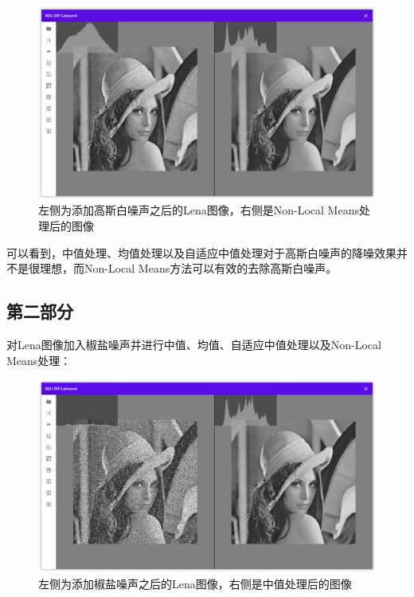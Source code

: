 \documentclass{article}
\begin{document}
\begin{figure}[H]
    \includegraphics[width=\textwidth]{img/gaussian/lena-nonlocal.png}
    \caption{左侧为添加高斯白噪声之后的Lena图像，右侧是Non-Local Means处理后的图像}
\end{figure}

可以看到，中值处理、均值处理以及自适应中值处理对于高斯白噪声的降噪效果并不是很理想，而Non-Local Means方法可以有效的去除高斯白噪声。

\subsection{第二部分}

对Lena图像加入椒盐噪声并进行中值、均值、自适应中值处理以及Non-Local Means处理：

\begin{figure}[H]
    \includegraphics[width=\textwidth]{img/saltpepper/lena-med.png}
    \caption{左侧为添加椒盐噪声之后的Lena图像，右侧是中值处理后的图像}
\end{figure}
\end{document}
